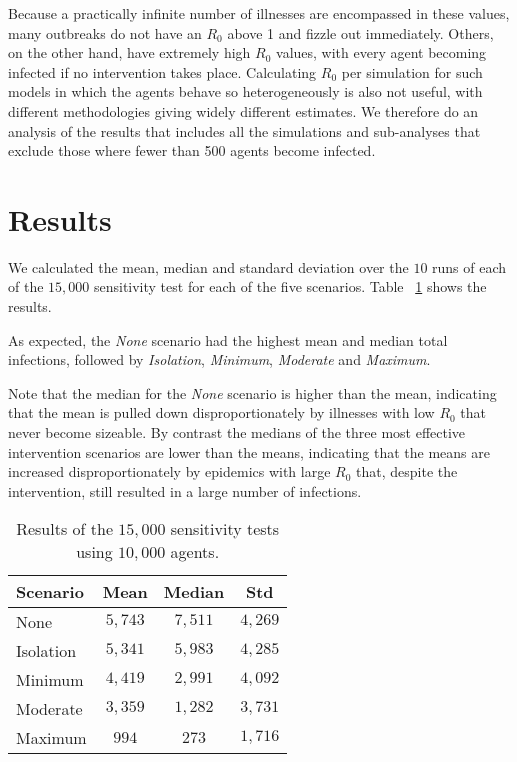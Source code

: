 \documentclass{article}
\begin{document}
Because a practically infinite number of illnesses are encompassed in these
values, many outbreaks do not have an $R_0$ above 1 and fizzle out
immediately. Others, on the other hand, have extremely high $R_0$ values, with
every agent becoming infected if no intervention takes place. Calculating $R_0$
per simulation for such models in which the agents behave so heterogeneously is
also not useful, with different methodologies giving widely different
estimates. We therefore do an analysis of the results that includes all the
simulations and sub-analyses that exclude those where fewer than 500 agents
become infected.

\section{Results}\label{results}

We calculated the mean, median and standard deviation over the $10$ runs of each
of the $15,000$ sensitivity test for each of the five scenarios. Table
~\ref{table:results_10k} shows the results.

As expected, the \emph{None} scenario had the highest mean and median total
infections, followed by \emph{Isolation}, \emph{Minimum}, \emph{Moderate} and
\emph{Maximum}.

Note that the median for the \emph{None} scenario is higher than the mean,
indicating that the mean is pulled down disproportionately by illnesses with
low $R_0$ that never become sizeable. By contrast the medians of the three most
effective intervention scenarios are lower than the means, indicating that the
means are increased disproportionately by epidemics with large $R_0$ that,
despite the intervention, still resulted in a large number of infections.

\begin{table}[h!]
  \centering
  \begin{tabular}{|l|c|c|c|}
    \hline
    Scenario & Mean & Median & Std\\ \hline
    None & $5,743$ & $7,511$ & $4,269$\\ \hline
    Isolation & $5,341$ & $5,983$ & $4,285$\\ \hline
    Minimum & $4,419$ & $2,991$ & $4,092$ \\ \hline
    Moderate & $3,359$ & $1,282$ & $3,731$ \\ \hline
    Maximum & $994$ & $273$ & $1,716$\\ \hline
  \end{tabular}
  \caption{Results of the $15,000$ sensitivity tests using $10,000$ agents.}
  \label{table:results_10k}
\end{table}
\end{document}

